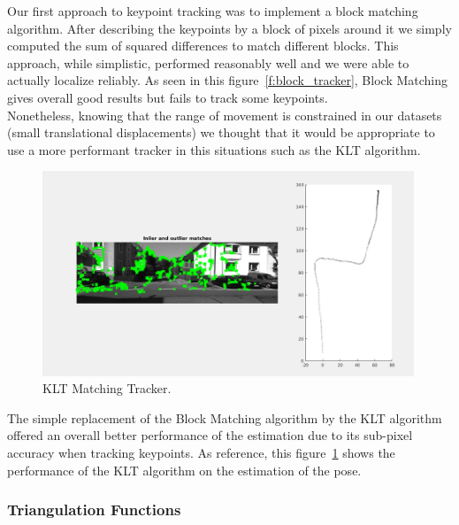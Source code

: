 Our first approach to keypoint tracking was to implement a block matching algorithm. After describing the keypoints by a block of pixels around it we simply computed the sum of squared differences to match different blocks. This approach, while simplistic, performed reasonably well and we were able to actually localize reliably. As seen in this figure~\ref{f:block_tracker}, Block Matching gives overall good results but fails to track some keypoints. \\
Nonetheless, knowing that the range of movement is constrained in our datasets (small translational displacements) we thought that it would be appropriate to use a more performant tracker in this situations such as the KLT algorithm.

\begin{figure}
  \includegraphics[width=0.99\textwidth]{files/klt_tracker.png}
  \caption[KLT Matching Tracker]{\label{f:klt_tracker}KLT Matching Tracker.}
\end{figure}


The simple replacement of the Block Matching algorithm by the KLT algorithm offered an overall better performance of the estimation due to its sub-pixel accuracy when tracking keypoints. As reference, this figure~\ref{f:klt_tracker} shows the performance of the KLT algorithm on the estimation of the pose.


\subsubsection{Triangulation Functions}

